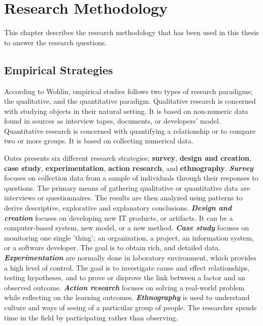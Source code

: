 
\chapter{Research Methodology}

This chapter describes the research methodology that has been used in this thesis to answer the research questions. 

\section{Empirical Strategies}
According to Wohlin\cite{Wohlin:2000:ESE:330775}, empirical studies follows two types of research paradigms; the qualitative, and the quantitative paradigm. Qualitative research is concerned with studying objects in their natural setting\cite{Wohlin:2000:ESE:330775}. It is based on non-numeric data found in sources as interview tapes, documents, or developers' model\cite{Wohlin:2000:ESE:330775}. Quantitative research is concerned with quantifying a relationship or to compare two or more groups\cite{Wohlin:2000:ESE:330775}. It is based on collecting numerical data\cite{Wohlin:2000:ESE:330775}. 

Oates\cite{Oates:2006:RIS:1202299} presents six different research strategies; \textbf{survey}, \textbf{design and creation}, \textbf{case study}, \textbf{experimentation}, \textbf{action research}, and \textbf{ethnography}. \textbf{\textit{Survey}} focuses on collection data from a sample of individuals through their responses to questions. The primary means of gathering qualitative or quantitative data are interviews or questionnaires. The results are then analyzed using patterns to derive descriptive, explorative and explanatory conclusions. \textbf{\textit{Design and creation}} focuses on developing new IT products, or artifacts. It can be a computer-based system, new model, or a new method. \textbf{\textit{Case study}} focuses on monitoring one single 'thing'; an organization, a project, an information system, or a software developer. The goal is to obtain rich, and detailed data. \textbf{\textit{Experimentation}} are normally done in laboratory environment, which provides a high level of control. The goal is to investigate cause and effect relationships, testing hypotheses, and to prove or disprove the link between a factor and an observed outcome. \textbf{\textit{Action research}} focuses on solving a real-world problem while reflecting on the learning outcomes. \textbf{\textit{Ethnography}} is used to understand culture and ways of seeing of a particular group of people. The researcher spends time in the field by participating rather than observing.


